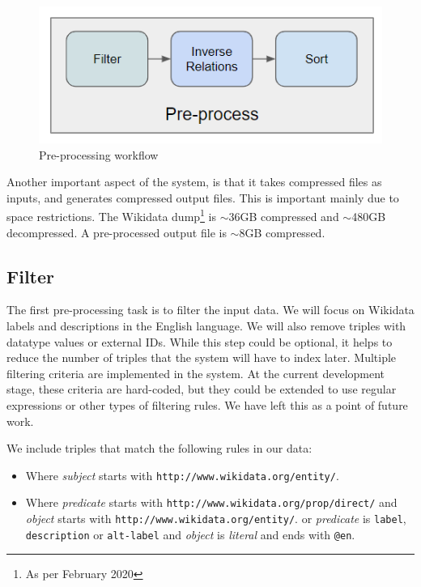 \begin{figure}[H]
    \centering
        \includegraphics[width=0.5\linewidth]{imagenes/Preprocess.png}
        \caption{Pre-processing workflow}
        \label{fig:preprocess}
\end{figure}

Another important aspect of the system, is that it takes compressed files as inputs, and generates compressed output files. 
This is important mainly due to space restrictions. 
The Wikidata dump\footnote{As per February 2020} is $\sim$36GB compressed and $\sim$480GB decompressed.
A pre-processed output file is $\sim$8GB compressed. 

\subsection{Filter}

The first pre-processing task is to filter the input data. 
We will focus on Wikidata labels and descriptions in the English language. 
We will also remove triples with datatype values or external IDs.
While this step could be optional, it helps to reduce the number of triples that the system will have to index later. 
Multiple filtering criteria are implemented in the system. 
At the current development stage, these criteria are hard-coded, but they could be extended to use regular expressions or other types of filtering rules. We have left this as a point of future work.

We include triples that match the following rules in our data:
\begin{itemize}
    \item Where \textit{subject} starts with \texttt{http://www.wikidata.org/entity/}.
    \item Where \textit{predicate} starts with \texttt{http://www.wikidata.org/prop/direct/} 
            \subsubitem and \textit{object} starts with \texttt{http://www.wikidata.org/entity/}.
        \subitem or \textit{predicate} is \texttt{label}, \texttt{description} or \texttt{alt-label} 
            \subsubitem and \textit{object} is \textit{literal} and ends with \texttt{@en}.
\end{itemize}

